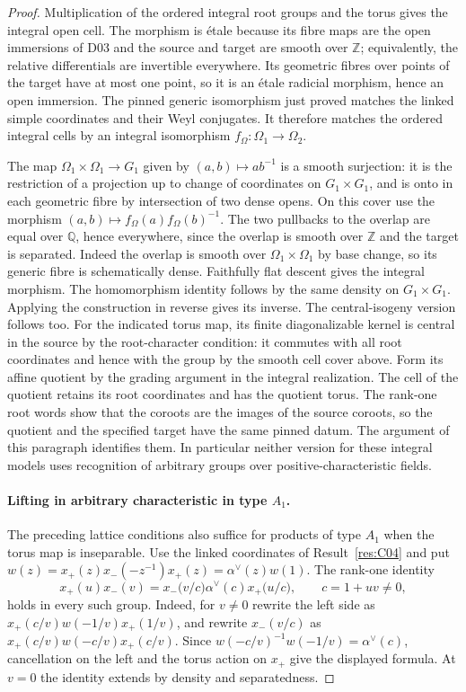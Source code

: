 \documentclass[11pt,a4paper,openany,oneside]{book}
\theoremstyle{resultstyle}
\theoremstyle{definition}
\numberwithin{equation}{chapter}
\newcommand{\ZZ}{\mathbb{Z}}
\newcommand{\QQ}{\mathbb{Q}}
\begin{document}
\begin{proof}
Multiplication of the ordered integral root groups and
the torus gives the integral open cell. The morphism is
\'etale because its fibre maps are the open immersions of
D03 and the source and target are smooth over \(\ZZ\);
equivalently, the relative differentials are invertible
everywhere. Its geometric fibres over points of the
target have at most one point, so it is an \'etale
radicial morphism, hence an open immersion. The pinned
generic isomorphism just proved matches the linked simple
coordinates and their Weyl conjugates. It therefore
matches the ordered integral cells by an integral
isomorphism \(f_\Omega:\Omega_1\to\Omega_2\).

The map \(\Omega_1\times\Omega_1\to G_1\) given by
\((a,b)\mapsto ab^{-1}\) is a smooth surjection:
it is the restriction of a projection up to change of
coordinates on \(G_1\times G_1\), and is onto in
each geometric fibre by intersection of two dense opens.
On this cover use the morphism
\((a,b)\mapsto f_\Omega(a)f_\Omega(b)^{-1}\).
The two pullbacks to the overlap are equal over
\(\QQ\), hence everywhere, since the overlap is smooth
over \(\ZZ\) and the target is separated. Indeed
the overlap is smooth over \(\Omega_1\times\Omega_1\)
by base change, so its generic fibre is schematically
dense. Faithfully flat descent gives the integral morphism.
The homomorphism identity follows by the same density on
\(G_1\times G_1\). Applying the construction in reverse
gives its inverse. The central-isogeny version follows too.
For the indicated torus map, its finite diagonalizable
kernel is central in the source by the root-character
condition: it commutes with all root coordinates and hence
with the group by the smooth cell cover above. Form its
affine quotient by the grading argument in the integral
realization. The cell of the quotient retains its root
coordinates and has the quotient torus. The rank-one
root words show that the coroots are the images of the
source coroots, so the quotient and the specified target
have the same pinned datum. The argument of this paragraph
identifies them. In particular neither version for these
integral models uses recognition of arbitrary groups over
positive-characteristic fields.

\paragraph{Lifting in arbitrary characteristic in type \texorpdfstring{\(A_1\)}{A1}.}
The preceding lattice conditions also suffice for products of type \(A_1\)
when the torus map is inseparable. Use the linked coordinates
of Result~\ref{res:C04} and put
\(w(z)=x_+(z)x_-(-z^{-1})x_+(z)=\alpha^\vee(z)w(1)\).
The rank-one identity
\[
 x_+(u)x_-(v)
 =x_-\bigl(v/c\bigr)\alpha^\vee(c)x_+\bigl(u/c\bigr),
 \qquad c=1+uv\ne0 ,
\]
holds in every such group. Indeed, for \(v\ne0\) rewrite
the left side as \(x_+(c/v)w(-1/v)x_+(1/v)\),
and rewrite \(x_-(v/c)\) as
\(x_+(c/v)w(-c/v)x_+(c/v)\).
Since \(w(-c/v)^{-1}w(-1/v)=\alpha^\vee(c)\),
cancellation on the left and the torus action on \(x_+\)
give the displayed formula. At \(v=0\) the identity
extends by density and separatedness.


\end{proof}
\end{document}

